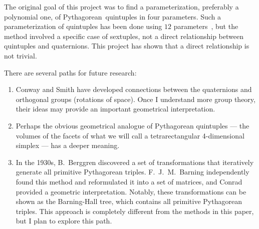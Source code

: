 \documentclass[12pt]{article}
\theoremstyle{definition}
\numberwithin{equation}{section}
\begin{document}
The original
goal of this project was to find a parameterization, preferably a polynomial one,  of 
Pythagorean~quintuples in four parameters.
Such a parameterization of quintuples
has been done using $12$ parameters~\cite{Polynomial_parametrization},
but the method involved a
specific case of sextuples, not a direct relationship between 
quintuples and quaternions. 
This project has shown that a
direct relationship is not trivial.



There are several paths
 for future research:
\begin{enumerate}


%


\item
{Conway and Smith have developed connections between the
 quaternions and 
orthogonal groups (rotations of space). 
Once I understand
 more group theory, their ideas may provide an important
 geometrical interpretation. 
}


\item
{ Perhaps the obvious geometrical analogue of Pythagorean quintuples
  --- the volumes of the facets of what we will call a
  tetrarectangular 4-dimensional simplex --- has a deeper meaning.  }



\item

{In the 1930s, B.\ Berggren \cite{Swedish_Tree} discovered a set of
transformations that iteratively generate all primitive Pythagorean
triples.  F.\ J.\ M.\ Barning \cite{Dutch_Tree} independently found
this method and reformulated it into a set of matrices, and Conrad 
\cite{Conrad} provided a geometric interpretation.  Notably,
these transformations can be shown as the Barning-Hall tree, which
contains all primitive Pythagorean triples.  This approach is 
completely different from the methods in this paper, but
I plan to explore this path.}




\end{enumerate}
\end{document}
